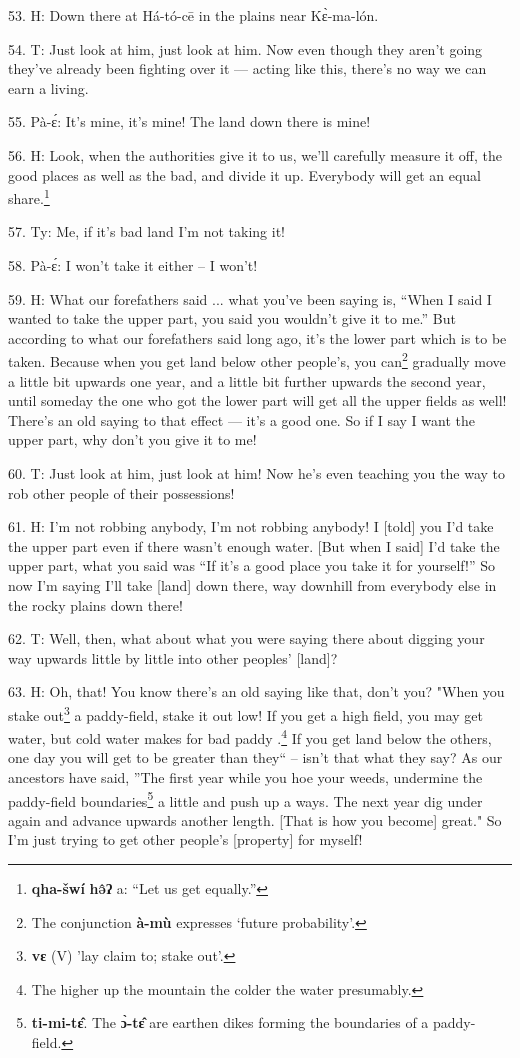 53. H: Down there at Há-tó-cē in the plains near Kɛ̀-ma-lón.

54. T: Just look at him, just look at him. Now even though they aren't going
they've already been fighting over it --- acting like this, there's no way we can
earn a living.

55. Pà-ɛ́: It's mine, it's mine! The land down there is mine!

56. H: Look, when the authorities give it to us, we'll carefully measure it off,
the good places as well as the bad, and divide it up. Everybody will get an equal
share.\footnote{\textbf{qha-šwí} \textbf{hə̂ʔ} a: ``Let us get equally.''}

57. Ty: Me, if it's bad land I'm not taking it!

58. Pà-ɛ́: I won't take it either -- I won't!

59. H: What our forefathers said ... what you've been saying is, ``When I said I
wanted to take the upper part, you said you wouldn't give it to me.'' But according
to what our forefathers said long ago, it's the lower part which is to be taken.
Because when you get land below other people's, you can\footnote{The conjunction \textbf{à-mù} expresses `future probability'.} gradually move a little
bit upwards one year, and a little bit further upwards the second year, until someday
the one who got the lower part will get all the upper fields as well! There's an
old saying to that effect --- it's a good one. So if I say I want the upper part,
why don't you give it to me!

60. T: Just look at him, just look at him! Now he's even teaching you the way
to rob other people of their possessions!

61. H: I'm not robbing anybody, I'm not robbing anybody! I [told] you I'd take the
upper part even if there wasn't enough water. [But when I said] I'd take the upper
part, what you said was ``If it's a good place you take it for yourself!''
So now I'm saying I'll take [land] down there, way downhill from everybody else
in the rocky plains down there!

62. T: Well, then, what about what you were saying there about digging your
way upwards little by little into other peoples' [land]?

63. H:  Oh, that! You know there's an old saying like
that, don't you? "When you stake out\footnote{\textbf{vɛ} (V) 'lay claim to; stake out'.} a paddy-field, stake it out
low! If you get a high field, you may get water, but cold water makes for bad paddy
.\footnote{The higher up the mountain the colder the water presumably.} If you get land below the others, one day you will get to be greater than
they`` -- isn't that what they say? As our ancestors have said, ''The
first year while you hoe your weeds, undermine the paddy-field boundaries\footnote{\textbf{ti-mi-tɛ̂}. The \textbf{ɔ̀-tɛ̂} are earthen dikes forming the boundaries of a paddy-field.} a
little and push up a ways. The next year dig under again and advance upwards another
length. [That is how you become] great." So I'm just trying to get other
people's [property] for myself!

